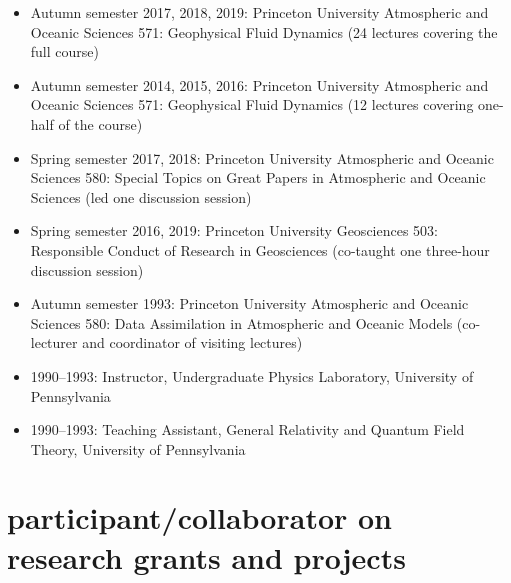\documentclass{article}
\begin{document}
\begin{itemize}[leftmargin=*]

\item Autumn semester 2017, 2018, 2019: Princeton University Atmospheric and Oceanic Sciences 571: Geophysical Fluid Dynamics (24 lectures covering the full course)

\item Autumn semester 2014, 2015, 2016: Princeton University Atmospheric and Oceanic Sciences 571: Geophysical Fluid Dynamics (12 lectures covering one-half of the course)

\item Spring semester 2017, 2018: Princeton University Atmospheric and Oceanic Sciences 580: Special Topics on Great Papers in Atmospheric and Oceanic Sciences (led one discussion session)

\item Spring semester 2016, 2019: Princeton University Geosciences 503: Responsible Conduct of Research in Geosciences (co-taught one three-hour discussion session)

\item Autumn semester 1993: Princeton University Atmospheric and Oceanic Sciences 580: Data Assimilation in Atmospheric and Oceanic Models (co-lecturer and coordinator of visiting lectures)

\item 1990--1993:  Instructor, Undergraduate Physics Laboratory, University of Pennsylvania 

\item 1990--1993:  Teaching Assistant,  General Relativity and Quantum Field Theory, University of Pennsylvania 

\end{itemize}


\section*{\sc \color{Maroon}  participant/collaborator on research grants and projects}
\vspace{-.3cm}
\end{document}
